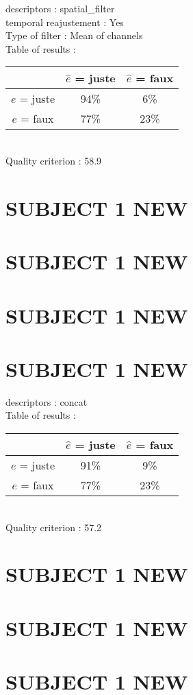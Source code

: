 descriptors : spatial_filter \\
temporal reajustement : Yes \\
Type of filter : Mean of channels \\
Table of results : \\
\begin{tabular}{|c|c|c|}
\hline				& $\hat{e}$ = juste & $\hat{e}$ = faux \\
\hline  $e$ = juste	&     94\%			&      6\%		\\
\hline  $e$ = faux	&     77\%			&     23\%		\\
\hline
\end{tabular}\\
Quality criterion :   58.9 \\

\newpage
\section*{SUBJECT 1 NEW}
\newpage
\section*{SUBJECT 1 NEW}
\newpage
\section*{SUBJECT 1 NEW}
\newpage
\section*{SUBJECT 1 NEW}
descriptors : concat \\
Table of results : \\
\begin{tabular}{|c|c|c|}
\hline				& $\hat{e}$ = juste & $\hat{e}$ = faux \\
\hline  $e$ = juste	&     91\%			&      9\%		\\
\hline  $e$ = faux	&     77\%			&     23\%		\\
\hline
\end{tabular}\\
Quality criterion :   57.2 \\

\newpage
\section*{SUBJECT 1 NEW}
\newpage
\section*{SUBJECT 1 NEW}
\newpage
\section*{SUBJECT 1 NEW}
